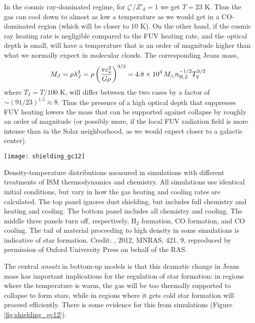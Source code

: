 In the cosmic ray-dominated regime, for $\zeta'/Z'_d = 1$ we get $T = 23$ K. Thus the gas can cool down to almost as low a temperature as we would get in a CO-dominated region (which will be closer to 10 K). On the other hand, if the cosmic ray heating rate is negligible compared to the FUV heating rate, and the optical depth is small, will have a temperature that is an order of magnitude higher than what we normally expect in molecular clouds. The corresponding Jeans mass,
\begin{equation}
M_J = \rho \lambda_J^3 = \rho \left(\frac{\pi c_s^2}{G \rho}\right)^{3/2} = 4.8\times 10^3\,M_\odot n_{\rm H,2}^{-1/2} T_2^{3/2}
\end{equation}
where $T_2 = T/100$ K, will differ between the two cases by a factor of $\sim (91/23)^{1.5} \approx 8$. Thus the presence of a high optical depth that suppresses FUV heating lowers the mass that can be supported against collapse by roughly an order of magnitude (or possibly more, if the local FUV radiation field is more intense than in the Solar neighborhood, as we would expect closer to a galactic center).

\begin{marginfigure}
\texttt{[image: shielding\_gc12]}
\caption[Density-temperature distribution for different cooling models]{
\label{fig:shielding_gc12}
Density-temperature distributions measured in simulations with different treatments of ISM thermodynamics and chemistry. All simulations use identical initial conditions, but vary in how the gas heating and cooling rates are calculated. The top panel ignores dust shielding, but includes full chemistry and heating and cooling. The bottom panel includes all chemistry and cooling. The middle three panels turn off, respectively, H$_2$ formation, CO formation, and CO cooling. The tail of material proceeding to high density in some simulations is indicative of star formation. Credit: \citeauthor{glover12a}, 2012, MNRAS, 421, 9, reproduced by permission of Oxford University Press on behalf of the RAS.
}
\end{marginfigure}

The central \textit{ansatz} in bottom-up models is that this dramatic change in Jeans mass has important implications for the regulation of star formation: in regions where the temperature is warm, the gas will be too thermally supported to collapse to form stars, while in regions where it gets cold star formation will proceed efficiently. There is some evidence for this from simulations (Figure \ref{fig:shielding_gc12}).

